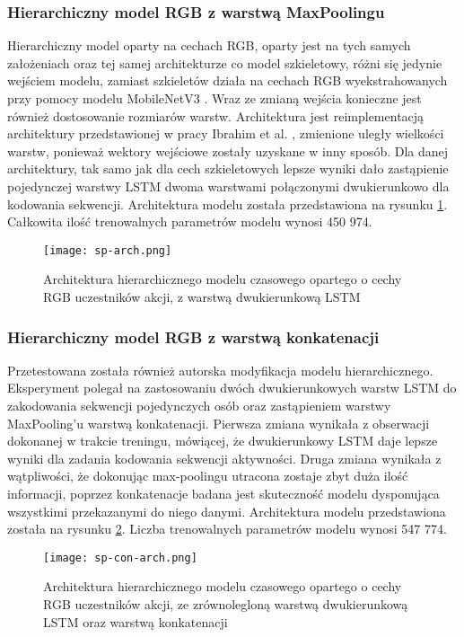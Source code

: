 \subsubsection{Hierarchiczny model RGB z warstwą MaxPoolingu}
Hierarchiczny model oparty na cechach RGB, oparty jest na tych samych założeniach oraz tej samej architekturze co model szkieletowy, różni się jedynie wejściem modelu, zamiast szkieletów działa na cechach RGB wyekstrahowanych przy pomocy modelu MobileNetV3 \cite{mobilenet}. Wraz ze zmianą wejścia konieczne jest również dostosowanie rozmiarów warstw. Architektura jest reimplementacją architektury przedstawionej w pracy Ibrahim et al. \cite{Ibrahim2015}, zmienione uległy wielkości warstw, ponieważ wektory wejściowe zostały uzyskane w inny sposób. Dla danej architektury, tak samo jak dla cech szkieletowych lepsze wyniki dało zastąpienie pojedynczej warstwy LSTM  dwoma warstwami połączonymi dwukierunkowo dla kodowania sekwencji. Architektura modelu została przedstawiona na rysunku \ref{fig:sp-arch}. Całkowita ilość trenowalnych parametrów modelu wynosi 450 974. 
\begin{figure}[!h]
    \centering \texttt{[image: sp-arch.png]}
    \caption{Architektura hierarchicznego modelu czasowego opartego o cechy RGB uczestników akcji, z warstwą dwukierunkową LSTM}
    \label{fig:sp-arch}
\end{figure}

\subsubsection{Hierarchiczny model RGB z warstwą konkatenacji}
Przetestowana została również autorska modyfikacja modelu hierarchicznego. Eksperyment polegał na zastosowaniu dwóch dwukierunkowych warstw LSTM do zakodowania sekwencji pojedynczych osób oraz zastąpieniem warstwy MaxPooling'u warstwą konkatenacji. Pierwsza zmiana wynikała z obserwacji dokonanej w trakcie treningu, mówiącej, że dwukierunkowy LSTM daje lepsze wyniki dla zadania kodowania sekwencji aktywności. Druga zmiana wynikała z wątpliwości, że dokonując max-poolingu utracona zostaje zbyt duża ilość informacji, poprzez konkatenacje badana jest skuteczność modelu dysponująca wszystkimi przekazanymi do niego danymi. Architektura modelu przedstawiona została na rysunku \ref{fig:sp-con-arch}. Liczba trenowalnych parametrów modelu wynosi 547 774. 
\begin{figure}[!h]
    \centering \texttt{[image: sp-con-arch.png]}
    \caption{Architektura hierarchicznego modelu czasowego opartego o cechy RGB uczestników akcji, ze zrównolegloną warstwą dwukierunkową LSTM oraz warstwą konkatenacji}
    \label{fig:sp-con-arch}
\end{figure}


